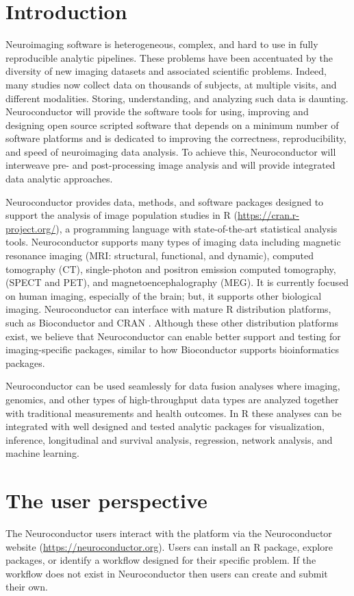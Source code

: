 \documentclass[]{elsarticle} %
\begin{document}
\section{Introduction}\label{introduction}

Neuroimaging software is heterogeneous, complex, and hard to use in fully reproducible analytic pipelines. These problems have been accentuated by the diversity of new imaging datasets and associated scientific problems. Indeed, many studies now collect data on thousands of subjects, at multiple visits, and different modalities. Storing, understanding, and analyzing such data is  daunting.  Neuroconductor will provide the software tools for using, improving and designing open source scripted software that depends on a minimum number of software platforms and is dedicated to improving the correctness, reproducibility, and speed of neuroimaging data analysis. To achieve this, Neuroconductor will interweave pre- and post-processing image analysis and will provide integrated data analytic approaches.


Neuroconductor provides data, methods, and software packages designed to support the analysis of image population studies in R (\url{https://cran.r-project.org/}), a programming language with state-of-the-art statistical analysis tools. Neuroconductor supports many types of imaging data including magnetic resonance imaging (MRI: structural, functional, and dynamic), computed tomography (CT), single-photon and positron emission computed tomography, (SPECT and PET), and magnetoencephalography (MEG). It is currently focused on human imaging, especially of the brain; but, it supports other biological imaging.  Neuroconductor can interface with mature R distribution platforms, such as Bioconductor \cite{bioc1,bioc2} and CRAN \cite{Hornik2016,r}.  Although these other distribution platforms exist, we believe that Neuroconductor can enable better support and testing for imaging-specific packages, similar to how Bioconductor supports bioinformatics packages.  

Neuroconductor can be used seamlessly for data fusion analyses where imaging, genomics, and other types of high-throughput data types are analyzed together with traditional measurements and health outcomes. In R these analyses can be integrated with well designed and tested analytic packages for visualization, inference, longitudinal and survival analysis, regression, network analysis, and machine learning.


\section{The user perspective}\label{section:user_perspective}
The Neuroconductor users interact with the platform via the Neuroconductor website (\url{https://neuroconductor.org}). Users can install an R package, explore packages, or identify a workflow designed for their specific problem. If the workflow does not exist in Neuroconductor then users can create and submit their own. 
\end{document}
